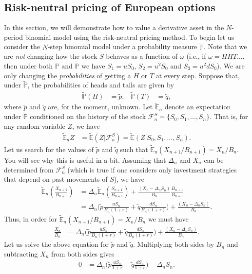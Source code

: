 \documentclass[12pt]{book}
\numberwithin{equation}{chapter}
\theoremstyle{plain}
\numberwithin{theorem}{section}
\theoremstyle{definition}
\numberwithin{exercise}{chapter}
\newcommand{\<}{\langle}
\renewcommand{\>}{\rangle}
\renewcommand{\(}{\left(}
\renewcommand{\)}{\right)}
\renewcommand{\[}{\left[}
\renewcommand{\]}{\right]}
\newcommand\Eb{\mathds{E}}
\newcommand\Pb{\mathds{P}}
\newcommand\Fc{\mathscr{F}}
\newcommand\om{\omega}
\newcommand\Del{\Delta}
\newcommand\Ebt{\widetilde{\Eb}}
\newcommand\Pbt{\widetilde{\Pb}}
\newcommand\qt{\widetilde{q}}
\theoremstyle{definition}
\numberwithin{question}{section}
\newcommand\pt{\widetilde{p}}
\begin{document}
\subsection{Risk-neutral pricing of  European options}
In this section, we will demonstrate how to value a derivative asset in the $N$-period binomial model using the risk-neutral pricing method.  To begin let us consider the $N$-step binomial model under a probability measure $\Pbt$.  
Note that we are \textit{not} changing how the stock $S$ behaves as a function of $\om$ (i.e., if $\om = HHT\ldots$, then under both $\Pb$ and $\Pbt$ we have $S_1 = uS_0$, $S_2 = u^2 S_0$ and $S_3 = u^2 d S_0$).  We are only changing the \emph{probabilities} of getting a $H$ or $T$ at every step.
Suppose that, under $\Pbt$, the probabilities of heads and tails are given by
\begin{align}
\Pbt(H)
	&=	\pt , &
\Pbt(T)
	&=	\qt ,
\end{align}
where $\pt$ and $\qt$ are, for the moment, unknown.  Let $\Ebt_n$ denote an expectation under $\Pbt$ conditioned on the history of the stock $\Fc_n^S = \{ S_0, S_1, \ldots, S_n \}$.  That is, for any random variable $Z$, we have
\begin{align}
\Ebt_n Z
	&=	\Ebt( Z | \Fc_n^S )
	=		\Ebt( Z | S_0, S_1, \ldots, S_n ) .
\end{align}
Let us search for the values of $\pt$ and $\qt$ such that $\Ebt_n (X_{n+1}/B_{n+1}) = X_n/B_n$.  You will see why this is useful in a bit.  Assuming that $\Del_n$ and $X_n$ can be determined from $\Fc_n^S$ (which is true if one considers only investment strategies that depend on past movements of $S$), we have
\begin{align}
\Ebt_n \( \frac{X_{n+1}}{B_{n+1}} \)
	&=	\Del_n \Ebt_n \( \frac{S_{n+1}}{B_{n+1}} \) + \frac{( X_n - \Del_n S_n )}{B_n} \frac{B_{n+1}}{B_{n+1}} \\
	&=	\Del_n \Big( \pt \frac{u S_n}{B_n (1+r)} + \qt \frac{dS_n}{B_n (1+r)} \Big) + \frac{(X_n - \Del_n S_n)}{B_n} .
\end{align}
Thus, in order for $\Ebt_n (X_{n+1}/B_{n+1}) = X_n/B_n$ we must have
\begin{align}
\frac{X_n}{B_n}
	&=	\Del_n \Big( \pt \frac{u S_n}{B_n (1+r)} + \qt \frac{dS_n}{B_n (1+r)} \Big) + \frac{(X_n - \Del_n S_n)}{B_n} .
\end{align}
Let us solve the above equation for $\pt$ and $\qt$.  Multiplying both sides by $B_n$ and subtracting $X_n$ from both sides gives
\begin{align}
0
	&=	\Del_n \Big( \pt \frac{u S_n}{1+r} + \qt \frac{d S_n}{1+r} \Big) - \Del_n S_n .
\end{align}
\end{document}
